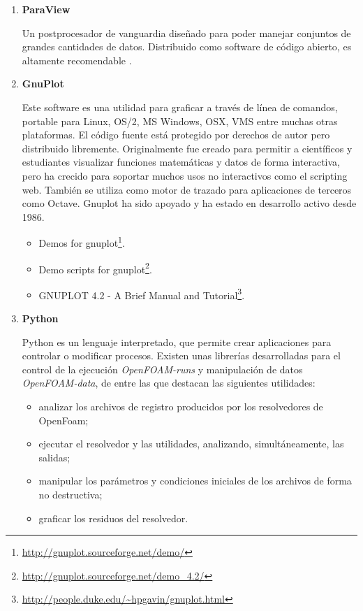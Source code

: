 \begin{enumerate}
\def\labelenumi{\arabic{enumi}.}
\item
  \textbf{ParaView} \cite{ParaView}

Un postprocesador de vanguardia diseñado para poder manejar conjuntos de
grandes cantidades de datos. Distribuido como software de código
abierto, es altamente recomendable \cite{kitware_blog} 
\cite{kitware_blog_1} \cite{UsingParaView} \cite{cfd-online_7} 
\cite{wangbo}.

\item
  \textbf{GnuPlot} \cite{gnuplot}


Este software es una utilidad para graficar a través de línea de
comandos, portable para Linux, OS/2, MS Windows, OSX, VMS entre muchas
otras plataformas. El código fuente está protegido por derechos de autor
pero distribuido libremente. Originalmente fue creado para permitir a
científicos y estudiantes visualizar funciones matemáticas y datos de
forma interactiva, pero ha crecido para soportar muchos usos no
interactivos como el scripting web. También se utiliza como motor de
trazado para aplicaciones de terceros como Octave. Gnuplot ha sido
apoyado y ha estado en desarrollo activo desde 1986.

\begin{itemize}
\item
  Demos for gnuplot\footnote{\url{http://gnuplot.sourceforge.net/demo/}}.
\item
  Demo scripts for
gnuplot\footnote{\url{http://gnuplot.sourceforge.net/demo_4.2/}}.
\item
GNUPLOT 4.2 - A
Brief Manual and Tutorial\footnote{\url{http://people.duke.edu/~hpgavin/gnuplot.html}}.
\end{itemize}

\item
  \textbf{Python}

Python es un lenguaje interpretado, que permite crear aplicaciones para
controlar o modificar procesos. Existen unas librerías desarrolladas
para el control de la ejecución \emph{OpenFOAM-runs} y manipulación de
datos \emph{OpenFOAM-data}, de entre las que destacan las siguientes
utilidades:

\begin{itemize}
\item
  analizar los archivos de registro producidos por los resolvedores de
  OpenFoam;
\item
  ejecutar el resolvedor y las utilidades, analizando, simultáneamente,
  las salidas;
\item
  manipular los parámetros y condiciones iniciales de los archivos de
  forma no destructiva;
\item
  graficar los residuos del resolvedor.
\end{itemize}


\end{enumerate}
